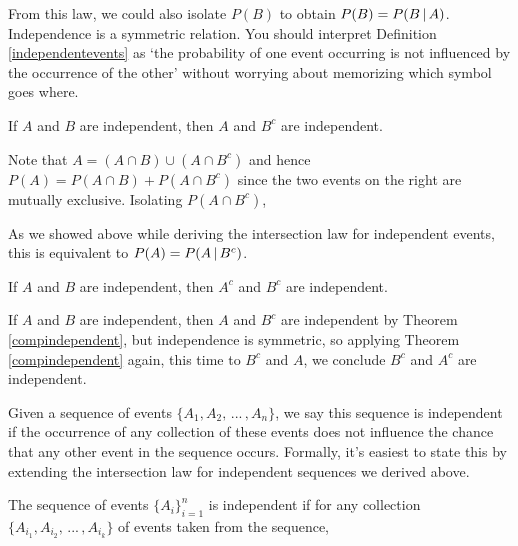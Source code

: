 \rmk From this law, we could also isolate $P(B)$ to obtain $P(B) = P(B \,|\, A)$. Independence is a symmetric relation. You should interpret Definition \ref{independentevents} as `the probability of one event occurring is not influenced by the occurrence of the other' without worrying about memorizing which symbol goes where.
\begin{thm}\label{compindependent}
If $A$ and $B$ are independent, then $A$ and $B^c$ are independent.
\end{thm}
\begin{pf}
Note that $A = (A \cap B) \cup (A \cap B^c)$ and hence $P(A) = P(A \cap B) + P(A \cap B^c)$ since the two events on the right are mutually exclusive. Isolating $P(A \cap B^c)$,
\par
\noindent As we showed above while deriving the intersection law for independent events, this is equivalent to $P(A) = P(A \,|\, B^c)$.
\end{pf}
\begin{cor}
If $A$ and $B$ are independent, then $A^c$ and $B^c$ are independent.
\end{cor}
\begin{pf}
If $A$ and $B$ are independent, then $A$ and $B^c$ are independent by Theorem \ref{compindependent}, but independence is symmetric, so applying Theorem \ref{compindependent} again, this time to $B^c$ and $A$, we conclude $B^c$ and $A^c$ are independent.
\end{pf}
\par
Given a sequence of events $\{A_1, A_2, \, ... \, , A_n\}$, we say this sequence is independent if the occurrence of any collection of these events does not influence the chance that any other event in the sequence occurs. Formally, it's easiest to state this by extending the intersection law for independent sequences we derived above.
\begin{defn}
The sequence of events $\{A_i\}_{i=1}^{n}$ is independent if for any collection $\{A_{i_1}, A_{i_2}, \, ... \, , A_{i_k}\}$ of events taken from the sequence,
\end{defn}
